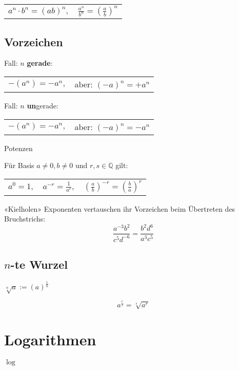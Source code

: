 \begin{multicols}{2}
\begin{tabular}{cc}
$a^n\cdot{}b^n = (ab)^n,$ & $\frac{a^n}{b^n} =\left(\frac{a}b\right)^n $\\
 \end{tabular}
 

\subsection{Vorzeichen}
Fall: $n$ \textbf{gerade}:

\begin{tabular}{cc}
 $-(a^n) = -a^n,$ & aber: $(-a)^n = +a^n$\\
 \end{tabular} 

Fall: $n$ \textbf{un}gerade:

\begin{tabular}{cc}
 $-(a^n) = -a^n,$ & aber: $(-a)^n = -a^n$\\
 \end{tabular} 


\begin{gesetz}{Potenzen}{}

Für Basis $a\ne 0, b\ne 0$ und $r, s\in\mathbb{Q}$ gilt:

\begin{tabular}{ccc}
$a^0=1,$ & $a^{-r} = \frac1{a^r},$ & $\left(\frac{a}b\right)^{-r} = \left(\frac{b}a\right)^r$ \\
 \end{tabular}
\end{gesetz}

\begin{rezept}{«Kielholen»}{}{}
Exponenten vertauschen ihr Vorzeichen beim Übertreten des Bruchstrichs:
$$\frac{a^{-3}b^2}{c^5d^{-6}} = \frac{b^2d^6}{a^3c^5}$$
\end{rezept}


\subsection{$n$-te Wurzel}
$\sqrt[n]{a} := \left(a\right)^\frac1n$
\begin{gesetz}{}{}
$$a^{\frac{r}s} = \sqrt[s]{a^r}$$
\end{gesetz}

\hrulefill
\section{Logarithmen}

\begin{definition}{$\log$}{}


\end{definition}
\end{multicols}
